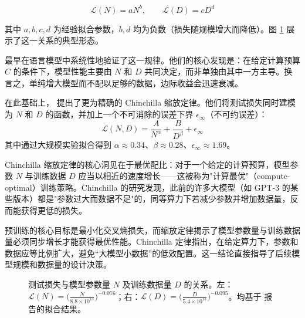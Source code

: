 \begin{equation}
  \mathcal{L}(N) = aN^{b}, \qquad \mathcal{L}(D) = cD^{d}
  \label{eq:scaling-power-law-basic}
\end{equation}

其中 $a,b,c,d$ 为经验拟合参数，$b,d$ 均为负数（损失随规模增大而降低）。图 \ref{fig:power-law-scaling-for-model-size-and-dataset-size} 展示了这一关系的典型形态。

\cite{kaplan-etal:2020scaling} 最早在语言模型中系统性地验证了这一规律。他们的核心发现是：在给定计算预算 $C$ 的条件下，模型性能主要由 $N$ 和 $D$ 共同决定，而非单独由其中一方主导。换言之，单纯增大模型而不配以足够的数据，边际收益会迅速衰减。

在此基础上，\cite{hoffmann-etal:2022training} 提出了更为精确的 Chinchilla 缩放定律。他们将测试损失同时建模为 $N$ 和 $D$ 的函数，并加上一个不可消除的误差下界 $\epsilon_{\infty}$（不可约误差）：
\begin{equation}
  \mathcal{L}(N,D) = \frac{A}{N^{\alpha}} + \frac{B}{D^{\beta}} + \epsilon_{\infty}
  \label{eq:scaling-chinchilla}
\end{equation}
其中通过大规模实验拟合得到 $\alpha \approx 0.34$、$\beta \approx 0.28$、$\epsilon_{\infty} \approx 1.69$。

Chinchilla 缩放定律的核心洞见在于最优配比：对于一个给定的计算预算，模型参数 $N$ 与训练数据 $D$ 应当以相近的速度增长——这被称为"计算最优"（compute-optimal）训练策略。Chinchilla 的研究发现，此前的许多大模型（如 GPT-3 的某些版本）都是"参数过大而数据不足"的，同等算力下若减少参数并增加数据量，反而能获得更低的损失。

\begin{importantnote}
预训练的核心目标是最小化交叉熵损失，而缩放定律揭示了模型参数量与训练数据量必须同步增长才能获得最优性能。Chinchilla 定律指出，在给定算力下，参数和数据应等比例扩大，避免“大模型小数据”的低效配置。这一结论直接指导了后续模型规模和数据量的设计决策。
\end{importantnote}

\begin{figure}[!t]
\centering

\caption{测试损失与模型参数量 $N$ 及训练数据量 $D$ 的关系。左：$\mathcal{L}(N) = \big( \frac{N}{8.8 \times 10^{13}} \big)^{-0.076}$；右：$\mathcal{L}(D) = \big( \frac{D}{5.4 \times 10^{13}} \big)^{-0.095}$。均基于 \cite{kaplan-etal:2020scaling} 报告的拟合结果。}
\label{fig:power-law-scaling-for-model-size-and-dataset-size}
\end{figure}

